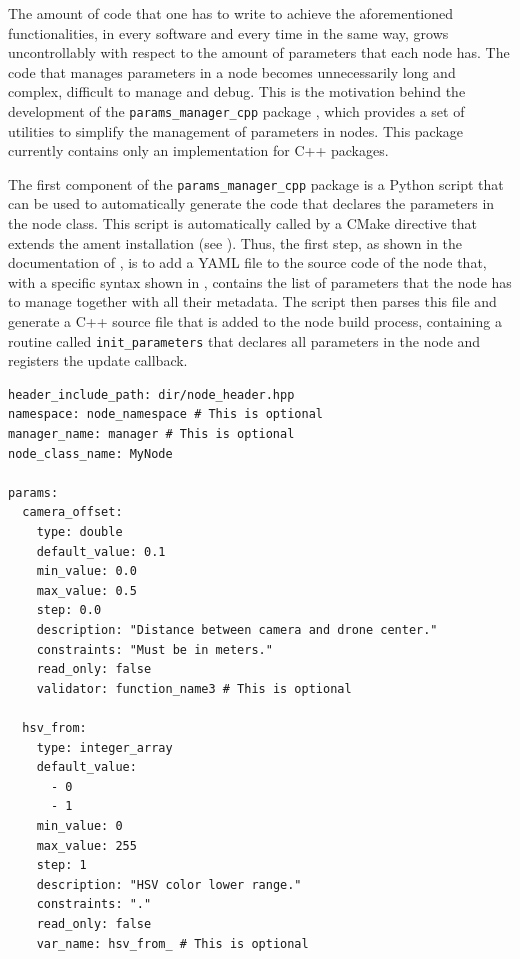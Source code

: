 The amount of code that one has to write to achieve the aforementioned functionalities, in every \ROS software and every time in the same way, grows uncontrollably with respect to the amount of parameters that each node has. The code that manages parameters in a \ROS node becomes unnecessarily long and complex, difficult to manage and debug. This is the motivation behind the development of the \texttt{params\_manager\_cpp} package \cite{masocco_params_manager_cpp_nodate}, which provides a set of utilities to simplify the management of parameters in \ROS nodes. This package currently contains only an implementation for C++ packages.

The first component of the \texttt{params\_manager\_cpp} package is a Python script that can be used to automatically generate the code that declares the parameters in the \ROS node class. This script is automatically called by a CMake directive that extends the ament installation (see ). Thus, the first step, as shown in the documentation of \cite{masocco_params_manager_cpp_nodate}, is to add a YAML file to the source code of the node that, with a specific syntax shown in , contains the list of parameters that the node has to manage together with all their metadata. The script then parses this file and generate a C++ source file that is added to the node build process, containing a routine called \texttt{init\_parameters} that declares all parameters in the node and registers the update callback.
\begin{center}
\begin{minipage}[t]{.9\textwidth}
\begin{lstlisting}[caption={Example of \texttt{params\_manager\_cpp} YAML configuration file \cite{masocco_params_manager_cpp_nodate}.}, label={lst:paramsmanager}]
header_include_path: dir/node_header.hpp
namespace: node_namespace # This is optional
manager_name: manager # This is optional
node_class_name: MyNode

params:
  camera_offset:
    type: double
    default_value: 0.1
    min_value: 0.0
    max_value: 0.5
    step: 0.0
    description: "Distance between camera and drone center."
    constraints: "Must be in meters."
    read_only: false
    validator: function_name3 # This is optional

  hsv_from:
    type: integer_array
    default_value:
      - 0
      - 1
    min_value: 0
    max_value: 255
    step: 1
    description: "HSV color lower range."
    constraints: "."
    read_only: false
    var_name: hsv_from_ # This is optional
\end{lstlisting}
\end{minipage}
\end{center}

